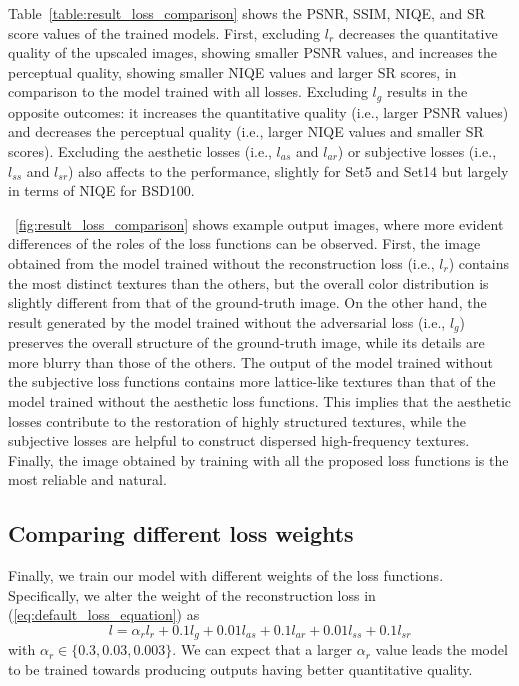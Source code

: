 \documentclass[runningheads]{llncs}
\begin{document}
Table~\ref{table:result_loss_comparison} shows the PSNR, SSIM, NIQE, and SR score values of the trained models.
First, excluding ${l}_{r}$ decreases the quantitative quality of the upscaled images, showing smaller PSNR values, and increases the perceptual quality, showing smaller NIQE values and larger SR scores, in comparison to the model trained with all losses.
Excluding ${l}_{g}$ results in the opposite outcomes: it increases the quantitative quality (i.e., larger PSNR values) and decreases the perceptual quality (i.e., larger NIQE values and smaller SR scores).
Excluding the aesthetic losses (i.e., ${l}_{as}$ and ${l}_{ar}$) or subjective losses (i.e., ${l}_{ss}$ and ${l}_{sr}$) also affects to the performance, slightly for Set5 and Set14 but largely in terms of NIQE for BSD100.

\figurename~\ref{fig:result_loss_comparison} shows example output images, where more evident differences of the roles of the loss functions can be observed.
First, the image obtained from the model trained without the reconstruction loss (i.e., ${l}_{r}$) contains the most distinct textures than the others, but the overall color distribution is slightly different from that of the ground-truth image.
On the other hand, the result generated by the model trained without the adversarial loss (i.e., ${l}_{g}$) preserves the overall structure of the ground-truth image, while its details are more blurry than those of the others.
The output of the model trained without the subjective loss functions contains more lattice-like textures than that of the model trained without the aesthetic loss functions.
This implies that the aesthetic losses contribute to the restoration of highly structured textures, while the subjective losses are helpful to construct dispersed high-frequency textures.
Finally, the image obtained by training with all the proposed loss functions is the most reliable and natural.

\subsection{Comparing different loss weights}

Finally, we train our model with different weights of the loss functions.
Specifically, we alter the weight of the reconstruction loss in (\ref{eq:default_loss_equation}) as
\begin{equation}
l = {\alpha}_{r} {l}_{r} + 0.1 {l}_{g} + 0.01 {l}_{as} + 0.1 {l}_{ar} + 0.01 {l}_{ss} + 0.1 {l}_{sr}
\end{equation}
with ${\alpha}_{r} \in \{0.3, 0.03, 0.003\}$.
We can expect that a larger ${\alpha}_{r}$ value leads the model to be trained towards producing outputs having better quantitative quality.
\end{document}
